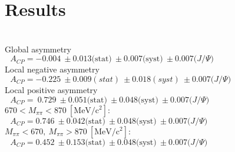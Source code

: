 \documentclass[10pt]{article}
\begin{document}
\section{Results}
~\\[5mm]

\LARGE Global asymmetry\\[2mm] $~~~A_{CP} = -0.004~\pm0.013\textrm{(stat)}~\pm0.007\textrm{(syst)}~\pm0.007\textrm{($J/\Psi$)}$\\[5mm]
\LARGE Local negative asymmetry\\[2mm] $~~~A_{CP} = -0.225~\pm0.009(stat) ~\pm0.018(syst)~\pm0.007\textrm{($J/\Psi$)}$\\[5mm]
\LARGE Local positive asymmetry\\[5mm] $~~~A_{CP} = ~0.729~\pm0.051\textrm{(stat)}~\pm0.048\textrm{(syst)}~\pm0.007\textrm{($J/\Psi$)}$\\[5mm]

\LARGE $670< M_{\pi\pi} < 870~[\textrm{MeV/c$^2$}]:$\\[1mm]
$~~~A_{CP} = 0.746~\pm0.042\textrm{(stat)}~\pm0.048\textrm{(syst)}~\pm0.007\textrm{($J/\Psi$)}$\\[5mm]
\LARGE $ M_{\pi\pi} < 670,~M_{\pi\pi} > 870~[\textrm{MeV/c$^2$}]:$\\[1mm]
$~~~A_{CP} = 0.452~\pm0.153\textrm{(stat)}~\pm0.048\textrm{(syst)}~\pm0.007\textrm{($J/\Psi$)}$\\[5mm]
\end{document}
